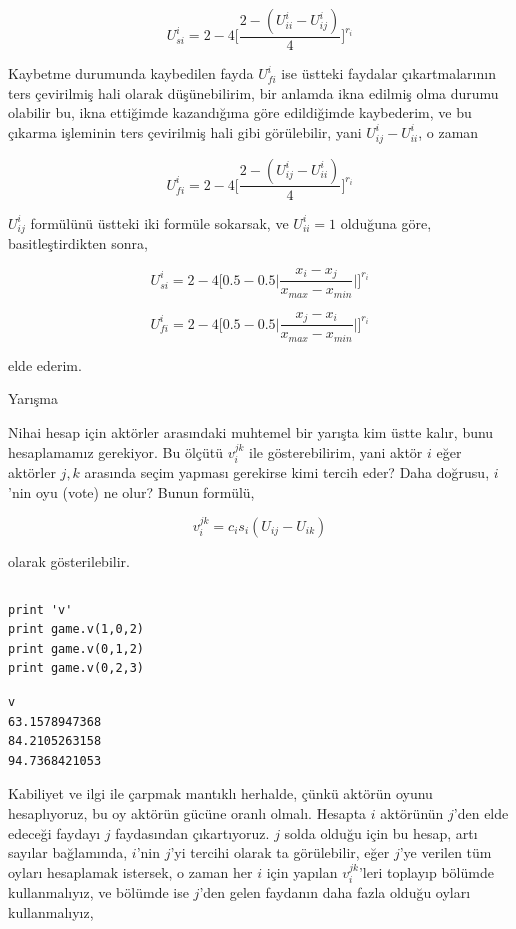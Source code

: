 \documentclass[12pt,fleqn]{article}\usepackage{../../common}
\begin{document}
$$ U_{si}^i = 2 - 4 \bigg[ \frac{2-(U_{ii}^i - U_{ij}^i)}{4}  \bigg]^{r_i}$$

Kaybetme durumunda kaybedilen fayda $U_{fi}^i$ ise üstteki faydalar
çıkartmalarının ters çevirilmiş hali olarak düşünebilirim, bir anlamda ikna
edilmiş olma durumu olabilir bu, ikna ettiğimde kazandığıma göre
edildiğimde kaybederim, ve bu çıkarma işleminin ters çevirilmiş hali gibi
görülebilir, yani $ U_{ij}^i - U_{ii}^i$, o zaman

$$ U_{fi}^i = 2 - 4 \bigg[ \frac{2-(U_{ij}^i - U_{ii}^i)}{4}  \bigg]^{r_i}$$

$U_{ij}^i$ formülünü üstteki iki formüle sokarsak, ve $U_{ii}^i=1$ olduğuna
göre, basitleştirdikten sonra,

$$ U_{si}^i = 2 - 4 
\bigg[ 
0.5 - 0.5 \bigg| \frac{x_i-x_j}{x_{max}-x_{min}} \bigg|
\bigg]^{r_i}
$$

$$ U_{fi}^i = 2 - 4 
\bigg[ 
0.5 - 0.5 \bigg| \frac{x_j-x_i}{x_{max}-x_{min}} \bigg|
\bigg]^{r_i}
$$

elde ederim.

Yarışma

Nihai hesap için aktörler arasındaki muhtemel bir yarışta kim üstte kalır,
bunu hesaplamamız gerekiyor. Bu ölçütü $v_i^{jk}$ ile gösterebilirim, yani
aktör $i$ eğer aktörler $j,k$ arasında seçim yapması gerekirse kimi tercih
eder? Daha doğrusu, $i$'nin oyu (vote) ne olur? Bunun formülü,

$$ v_i^{jk} = c_is_i (U_{ij} - U_{ik}) $$

olarak gösterilebilir. 

\inputminted[fontsize=\footnotesize]{python}{scholz.py}

\begin{verbatim}
print 'v'
print game.v(1,0,2)
print game.v(0,1,2)
print game.v(0,2,3)
\end{verbatim}

\begin{verbatim}
v
63.1578947368
84.2105263158
94.7368421053
\end{verbatim}

Kabiliyet ve ilgi ile çarpmak mantıklı herhalde, çünkü aktörün oyunu
hesaplıyoruz, bu oy aktörün gücüne oranlı olmalı. Hesapta $i$ aktörünün $j$'den
elde edeceği faydayı $j$ faydasından çıkartıyoruz. $j$ solda olduğu için bu
hesap, artı sayılar bağlamında, $i$'nin $j$'yi tercihi olarak ta görülebilir,
eğer $j$'ye verilen tüm oyları hesaplamak istersek, o zaman her $i$ için yapılan
$v_i^{jk}$'leri toplayıp bölümde kullanmalıyız, ve bölümde ise $j$'den gelen
faydanın daha fazla olduğu oyları kullanmalıyız,
\end{document}
